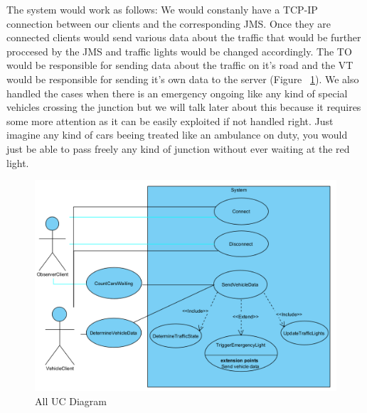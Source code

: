 \documentclass[17pt]{article}
\begin{document}
\pagebreak
The system would work as follows: We would constanly have a TCP-IP connection
between our clients and the corresponding JMS. Once they are connected
clients would send various data about the traffic that would be further 
proccesed by the JMS and traffic lights would be changed accordingly. The
TO would be responsible for sending data about the traffic on it's road and the 
VT would be responsible for sending it's own data to the server (Figure ~\ref{fig:UC_DiagramAll}). 
We also handled the cases when there is an emergency ongoing like any kind of
special vehicles crossing the junction but we will talk later about this
because it requires some more attention as it can be easily exploited if not 
handled right. Just imagine any kind of cars beeing treated like an ambulance
on duty, you would just be able to pass freely any kind of junction without 
ever waiting at the red light.\\

\begin{figure}[h!]
    \includegraphics[width=\textwidth]{UC/UCDiagram.png}
    \caption{All UC Diagram}
    \label{fig:UC_DiagramAll}
\end{figure}

\pagebreak
\end{document}
